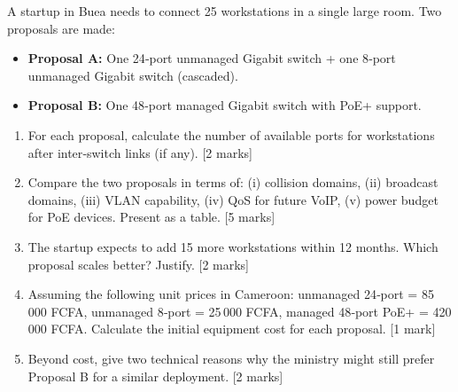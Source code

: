 \documentclass[11pt]{article}
\begin{document}
\begin{exercice}
A startup in Buea needs to connect 25 workstations in a single large room. Two proposals are made:
\begin{itemize}
\item \textbf{Proposal A:} One 24‑port unmanaged Gigabit switch + one 8‑port unmanaged Gigabit switch (cascaded).
\item \textbf{Proposal B:} One 48‑port managed Gigabit switch with PoE+ support.
\end{itemize}
\begin{enumerate}
\item For each proposal, calculate the number of available ports for workstations after inter‑switch links (if any). [2 marks]
\item Compare the two proposals in terms of: (i) collision domains, (ii) broadcast domains, (iii) VLAN capability, (iv) QoS for future VoIP, (v) power budget for PoE devices. Present as a table. [5 marks]
\item The startup expects to add 15 more workstations within 12 months. Which proposal scales better? Justify. [2 marks]
\item Assuming the following unit prices in Cameroon: unmanaged 24‑port = 85\,000 FCFA, unmanaged 8‑port = 25\,000 FCFA, managed 48‑port PoE+ = 420\,000 FCFA. Calculate the initial equipment cost for each proposal. [1 mark]
\item Beyond cost, give two technical reasons why the ministry might still prefer Proposal B for a similar deployment. [2 marks]
\end{enumerate}
\end{exercice}
\end{document}
